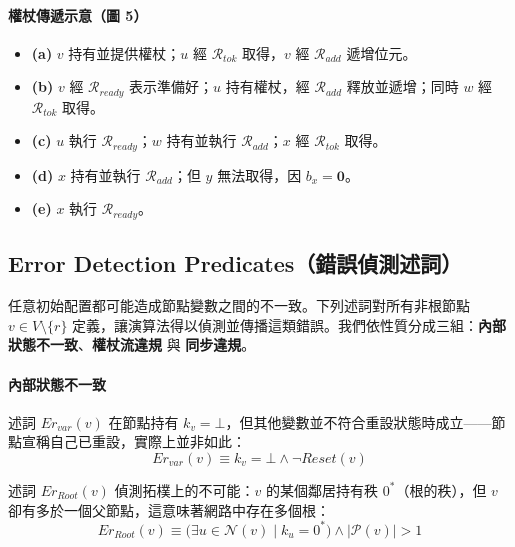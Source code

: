 \documentclass[a4paper, 12pt]{article}
\newcommand{\Neig}{\mathcal{N}}
\newcommand{\Pa}{\mathcal{P}}
\newcommand{\bz}{\mathbf{0}}
\newcommand{\rk}{k}
\newcommand{\Rtok}{\mathscr{R}_{tok}}
\newcommand{\Radd}{\mathscr{R}_{add}}
\newcommand{\Rready}{\mathscr{R}_{ready}}
\begin{document}
\paragraph{權杖傳遞示意（圖 5）}
\begin{itemize}
    \item \textbf{(a)} \(v\) 持有並提供權杖；\(u\) 經 \(\Rtok\) 取得，\(v\) 經 \(\Radd\) 遞增位元。
    \item \textbf{(b)} \(v\) 經 \(\Rready\) 表示準備好；\(u\) 持有權杖，經 \(\Radd\) 釋放並遞增；同時 \(w\) 經 \(\Rtok\) 取得。
    \item \textbf{(c)} \(u\) 執行 \(\Rready\)；\(w\) 持有並執行 \(\Radd\)；\(x\) 經 \(\Rtok\) 取得。
    \item \textbf{(d)} \(x\) 持有並執行 \(\Radd\)；但 \(y\) 無法取得，因 \(b_x=\bz\)。
    \item \textbf{(e)} \(x\) 執行 \(\Rready\)。
\end{itemize}

\subsection{Error Detection Predicates（錯誤偵測述詞）}
\label{subsub:ED}

任意初始配置都可能造成節點變數之間的不一致。下列述詞對所有非根節點 \(v\in V\setminus\{r\}\) 定義，讓演算法得以偵測並傳播這類錯誤。我們依性質分成三組：\textbf{內部狀態不一致}、\textbf{權杖流違規} 與 \textbf{同步違規}。

\paragraph*{內部狀態不一致}

述詞 \(Er_{var}(v)\) 在節點持有 \(\rk_v=\bot\)，但其他變數並不符合重設狀態時成立——節點宣稱自己已重設，實際上並非如此：
\begin{equation}
    Er_{var}(v) \equiv \rk_v = \bot \wedge \neg \mathit{Reset}(v)
    \label{eq:zhErRst}
\end{equation}

述詞 \(Er_{Root}(v)\) 偵測拓樸上的不可能：\(v\) 的某個鄰居持有秩 \(0^*\)（根的秩），但 \(v\) 卻有多於一個父節點，這意味著網路中存在多個根：
\begin{equation}
    Er_{Root}(v) \equiv \bigl(\exists u \in \Neig(v) \mid \rk_u = 0^*\bigr) \wedge |\Pa(v)| > 1
\end{equation}
\end{document}
